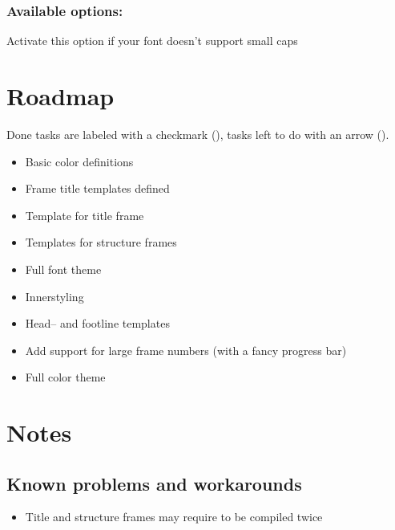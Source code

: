 \documentclass[11pt]{ltxdoc}
\newcommand{\cmark}{\ding{51}}
\newcommand{\darrow}{\ding{212}}
\begin{document}
	\subsubsection*{Available options:}
	Activate this option if your font doesn't support small caps
	
	
	
	
	\section{Roadmap}
	Done tasks are labeled with a checkmark (\cmark), tasks left to do with an arrow (\darrow).
	\begin{itemize}
		\item[\cmark]  Basic color definitions
		\item[\cmark]  Frame title templates defined
		\item[\cmark]  Template for title frame
		\item[\cmark]  Templates for structure frames
		\item[\cmark]  Full font theme
		\item[\darrow] Innerstyling
		\item[\darrow] Head-- and footline templates
		\item[\darrow] Add support for large frame numbers (with a fancy progress bar)
		\item[\darrow] Full color theme
	\end{itemize}
	
	
	\section{Notes}
	\subsection{Known problems and workarounds}
	\begin{itemize}
		\item%
		Title and structure frames may require to be compiled twice
	\end{itemize}
	
	
	\vfill
	\thispagestyle{empty}
	\listoffigures
\end{document}

